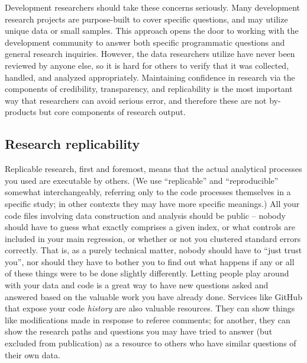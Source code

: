 Development researchers should take these concerns seriously.
Many development research projects are purpose-built to cover specific questions,
and may utilize unique data or small samples.
This approach opens the door to working with the development community
to answer both specific programmatic questions and general research inquiries.
However, the data researchers utilize have never been reviewed by anyone else,
so it is hard for others to verify that it was collected, handled, and analyzed appropriately.
Maintaining confidence in research via the components of credibility, transparency, and replicability
is the most important way that researchers can avoid serious error,
and therefore these are not by-products but core components of research output.

\subsection{Research replicability}

Replicable research, first and foremost,
means that the actual analytical processes you used are executable by others.\cite{dafoe2014science}
(We use ``replicable'' and ``reproducible'' somewhat interchangeably,
referring only to the code processes themselves in a specific study;
in other contexts they may have more specific meanings.)
All your code files involving data construction and analysis
should be public -- nobody should have to guess what exactly comprises a given index,
or what controls are included in your main regression,
or whether or not you clustered standard errors correctly.
That is, as a purely technical matter, nobody should have to ``just trust you'',
nor should they have to bother you to find out what happens
if any or all of these things were to be done slightly differently.\cite{simmons2011false,wicherts2016degrees}
Letting people play around with your data and code is a great way to have new questions asked and answered
based on the valuable work you have already done.
Services like GitHub that expose your code \textit{history}
are also valuable resources. They can show things like modifications
made in response to referee comments; for another, they can show
the research paths and questions you may have tried to answer
(but excluded from publication)
as a resource to others who have similar questions of their own data.

